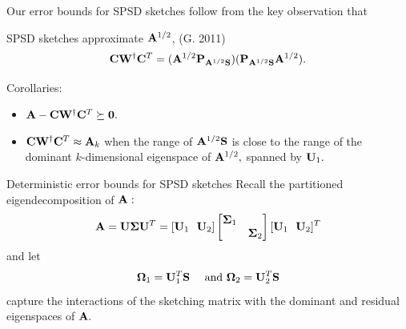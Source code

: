 \documentclass[xcolor=x11names,compress,ignorenonframetext,10pt]{beamer}
\renewcommand{\(}{\begin{columns}}
\renewcommand{\)}{\end{columns}}
\newcommand{\<}[1]{\begin{column}{#1}}
\renewcommand{\>}{\end{column}}
\def\refcolor{DodgerBlue4}
\newcommand{\refer}[1]{({\color{\refcolor}#1})}
\begin{document}
\begin{frame}
 Our error bounds for SPSD sketches follow from the key observation that 
 \begin{block}{SPSD sketches approximate $\mathbf{A}^{1/2}$, \refer{G. 2011}}
  \[
   \mathbf{C}\mathbf{W}^\dagger \mathbf{C}^T = (\mathbf{A}^{1/2} \mathbf{P}_{\mathbf{A}^{1/2} \mathbf{S}}) (\mathbf{P}_{\mathbf{A}^{1/2} \mathbf{S}} \mathbf{A}^{1/2}).
  \]
 \end{block}
 
 Corollaries:
 \begin{itemize}
  \item $\mathbf{A} - \mathbf{C} \mathbf{W}^\dagger \mathbf{C}^T \succeq \mathbf{0}.$
  \item $\mathbf{C}\mathbf{W}^\dagger \mathbf{C}^T \approx \mathbf{A}_k$ when the range of $\mathbf{A}^{1/2} \mathbf{S}$ is close to the 
 range of the dominant $k$-dimensional eigenspace of $\mathbf{A}^{1/2},$ spanned by $\mathbf{U}_1.$
 \end{itemize}
\end{frame}


\begin{frame}{Deterministic error bounds for SPSD sketches}
 Recall the partitioned eigendecomposition of $\mathbf{A}:$
  \[ \mathbf{A} = \mathbf{U} \boldsymbol{\Sigma} \mathbf{U}^T = [\mathbf{U}_1 \ \ \mathbf{U}_2] 
  \left[\begin{matrix} \boldsymbol{\Sigma}_1 & \\ & \boldsymbol{\Sigma}_2 \end{matrix} \right] 
  [\mathbf{U}_1 \ \ \mathbf{U}_2]^T
  \]
  and let
 \[
  \boldsymbol{\Omega}_1 = \mathbf{U}_1^T \mathbf{S} \quad \text{ and } \boldsymbol{\Omega}_2 = \mathbf{U}_2^T \mathbf{S}
 \]
 capture the interactions of the sketching matrix with the dominant and residual eigenspaces of $\mathbf{A}.$
 \vspace{1em}

\end{frame}

% 
% 
% 
\end{document}
